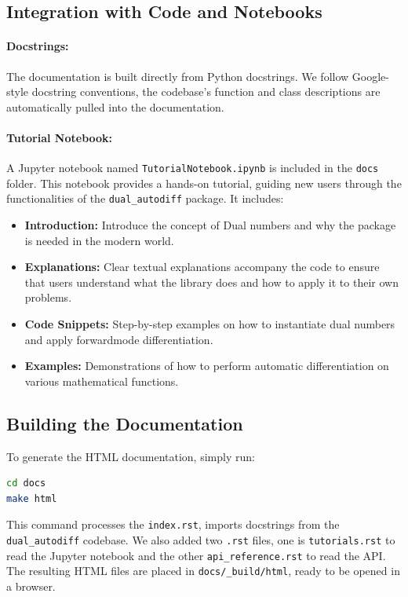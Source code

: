 \documentclass[12.5pt]{article}
\begin{document}
\subsection*{Integration with Code and Notebooks}

\paragraph{Docstrings:} The documentation is built directly from Python docstrings. We follow Google-style docstring conventions, the codebase's function and class descriptions are automatically pulled into the documentation.

\paragraph{Tutorial Notebook:} A Jupyter notebook named \texttt{TutorialNotebook.ipynb} is included in the \texttt{docs} folder. This notebook provides a hands-on tutorial, guiding new users through the functionalities of the \texttt{dual\_autodiff} package. It includes:
\begin{itemize}
    \item \textbf{Introduction:} Introduce the concept of Dual numbers and why the package is needed in the modern world.
    \item \textbf{Explanations:} Clear textual explanations accompany the code to ensure that users understand what the library does and how to apply it to their own problems.
    \item \textbf{Code Snippets:} Step-by-step examples on how to instantiate dual numbers and apply forwardmode differentiation.
    \item \textbf{Examples:} Demonstrations of how to perform automatic differentiation on various mathematical functions.
\end{itemize}

\subsection*{Building the Documentation}

To generate the HTML documentation, simply run:

\begin{lstlisting}[language=bash]
cd docs
make html
\end{lstlisting}

This command processes the \texttt{index.rst}, imports docstrings from the \texttt{dual\_autodiff} codebase. We also added two \texttt{.rst} files, one is \texttt{tutorials.rst} to read the Jupyter notebook and the other \texttt{api\_reference.rst} to read the API. The resulting HTML files are placed in \texttt{docs/\_build/html}, ready to be opened in a browser.
\end{document}
